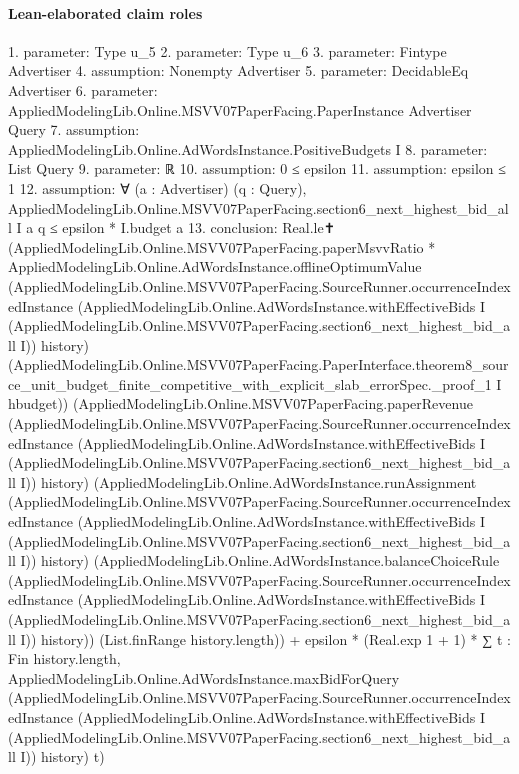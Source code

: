 \documentclass[10pt]{article}
\begin{document}
\paragraph{Lean-elaborated claim roles}\begin{ReviewVerbatim}
1. parameter: Type u_5
2. parameter: Type u_6
3. parameter: Fintype Advertiser
4. assumption: Nonempty Advertiser
5. parameter: DecidableEq Advertiser
6. parameter: AppliedModelingLib.Online.MSVV07PaperFacing.PaperInstance Advertiser Query
7. assumption: AppliedModelingLib.Online.AdWordsInstance.PositiveBudgets I
8. parameter: List Query
9. parameter: ℝ
10. assumption: 0 ≤ epsilon
11. assumption: epsilon ≤ 1
12. assumption: ∀ (a : Advertiser) (q : Query),
  AppliedModelingLib.Online.MSVV07PaperFacing.section6_next_highest_bid_all I a q ≤ epsilon * I.budget a
13. conclusion: Real.le✝
  (AppliedModelingLib.Online.MSVV07PaperFacing.paperMsvvRatio *
    AppliedModelingLib.Online.AdWordsInstance.offlineOptimumValue
      (AppliedModelingLib.Online.MSVV07PaperFacing.SourceRunner.occurrenceIndexedInstance
        (AppliedModelingLib.Online.AdWordsInstance.withEffectiveBids I
          (AppliedModelingLib.Online.MSVV07PaperFacing.section6_next_highest_bid_all I))
        history)
      (AppliedModelingLib.Online.MSVV07PaperFacing.PaperInterface.theorem8_source_unit_budget_finite_competitive_with_explicit_slab_errorSpec._proof_1
        I hbudget))
  (AppliedModelingLib.Online.MSVV07PaperFacing.paperRevenue
      (AppliedModelingLib.Online.MSVV07PaperFacing.SourceRunner.occurrenceIndexedInstance
        (AppliedModelingLib.Online.AdWordsInstance.withEffectiveBids I
          (AppliedModelingLib.Online.MSVV07PaperFacing.section6_next_highest_bid_all I))
        history)
      (AppliedModelingLib.Online.AdWordsInstance.runAssignment
        (AppliedModelingLib.Online.MSVV07PaperFacing.SourceRunner.occurrenceIndexedInstance
          (AppliedModelingLib.Online.AdWordsInstance.withEffectiveBids I
            (AppliedModelingLib.Online.MSVV07PaperFacing.section6_next_highest_bid_all I))
          history)
        (AppliedModelingLib.Online.AdWordsInstance.balanceChoiceRule
          (AppliedModelingLib.Online.MSVV07PaperFacing.SourceRunner.occurrenceIndexedInstance
            (AppliedModelingLib.Online.AdWordsInstance.withEffectiveBids I
              (AppliedModelingLib.Online.MSVV07PaperFacing.section6_next_highest_bid_all I))
            history))
        (List.finRange history.length)) +
    epsilon * (Real.exp 1 + 1) *
      ∑ t : Fin history.length,
        AppliedModelingLib.Online.AdWordsInstance.maxBidForQuery
          (AppliedModelingLib.Online.MSVV07PaperFacing.SourceRunner.occurrenceIndexedInstance
            (AppliedModelingLib.Online.AdWordsInstance.withEffectiveBids I
              (AppliedModelingLib.Online.MSVV07PaperFacing.section6_next_highest_bid_all I))
            history)
          t)
\end{ReviewVerbatim}
\end{document}
